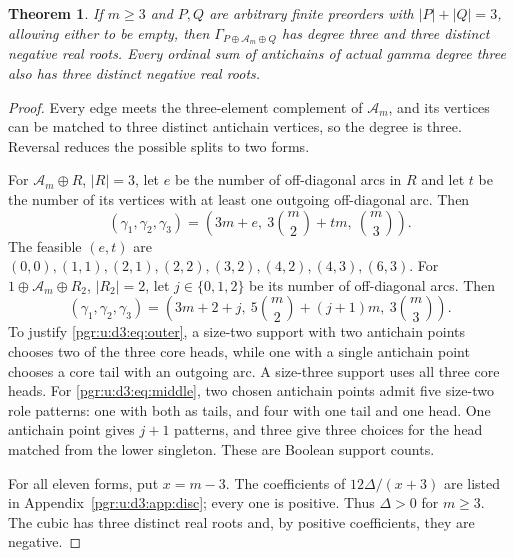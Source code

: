 \documentclass[11pt]{article}
\numberwithin{equation}{section}
\newtheorem{theorem}{Theorem}[section]\newtheorem{lemma}[theorem]{Lemma}\newtheorem{proposition}[theorem]{Proposition}\newtheorem{corollary}[theorem]{Corollary}
\theoremstyle{definition}\newtheorem{definition}[theorem]{Definition}\newtheorem{remark}[theorem]{Remark}
\newcommand{\Ga}{\Gamma}                   %
\begin{document}
\begin{theorem}\label{pgr:u:d3:thm:ordinal}
If $m\ge3$ and $P,Q$ are arbitrary finite preorders with $|P|+|Q|=3$, allowing either to be empty, then $\Ga_{P\oplus\mathcal A_m\oplus Q}$ has degree three and three distinct negative real roots. Every ordinal sum of antichains of actual gamma degree three also has three distinct negative real roots.
\end{theorem}
\begin{proof}
Every edge meets the three-element complement of $\mathcal A_m$, and its vertices can be matched to three distinct antichain vertices, so the degree is three. Reversal reduces the possible splits to two forms.

For $\mathcal A_m\oplus R$, $|R|=3$, let $e$ be the number of off-diagonal arcs in $R$ and let $t$ be the number of its vertices with at least one outgoing off-diagonal arc. Then
\begin{equation}\label{pgr:u:d3:eq:outer}
 (\gamma_1,\gamma_2,\gamma_3)=
 \left(3m+e,\ 3\binom m2+tm,\ \binom m3\right).
\end{equation}
The feasible $(e,t)$ are $(0,0),(1,1),(2,1),(2,2),(3,2),(4,2),(4,3),(6,3)$. For $1\oplus\mathcal A_m\oplus R_2$, $|R_2|=2$, let $j\in\{0,1,2\}$ be its number of off-diagonal arcs. Then
\begin{equation}\label{pgr:u:d3:eq:middle}
 (\gamma_1,\gamma_2,\gamma_3)=
 \left(3m+2+j,\ 5\binom m2+(j+1)m,\ 3\binom m3\right).
\end{equation}
To justify \eqref{pgr:u:d3:eq:outer}, a size-two support with two antichain points chooses two of the three core heads, while one with a single antichain point chooses a core tail with an outgoing arc. A size-three support uses all three core heads. For \eqref{pgr:u:d3:eq:middle}, two chosen antichain points admit five size-two role patterns: one with both as tails, and four with one tail and one head. One antichain point gives $j+1$ patterns, and three give three choices for the head matched from the lower singleton. These are Boolean support counts.

For all eleven forms, put $x=m-3$. The coefficients of $12\Delta/(x+3)$ are listed in Appendix~\ref{pgr:u:d3:app:disc}; every one is positive. Thus $\Delta>0$ for $m\ge3$. The cubic has three distinct real roots and, by positive coefficients, they are negative.


\end{proof}
\end{document}
